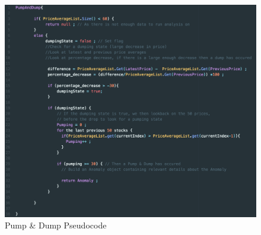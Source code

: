 \documentclass[12pt]{article}
\begin{document}
    \begin{figure}[H]
    \centering
    \includegraphics[width=130mm]{PDpseudo.png}
    \caption{Pump \& Dump Pseudocode}
    \label{2}
    \end{figure}
\end{document}
